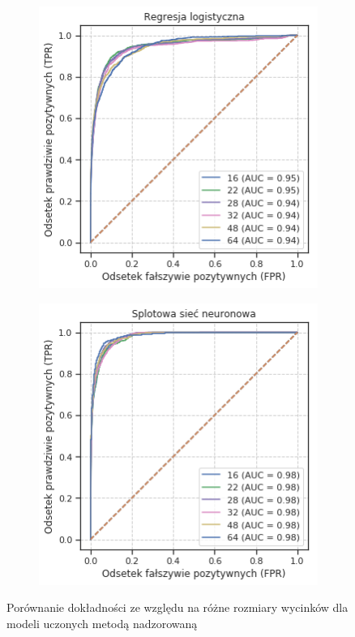\begin{figure}[h!]
  \centering
  \begin{subfigure}[b]{0.45\linewidth}
    \includegraphics[width=\linewidth]{images/logreg_patch_roc_v2}
  \end{subfigure}
  \begin{subfigure}[b]{0.45\linewidth}
    \includegraphics[width=\linewidth]{images/cnn_patch_roc_v2}
  \end{subfigure}
  \caption{Porównanie dokładności ze względu na różne rozmiary wycinków dla modeli uczonych metodą nadzorowaną}
  \label{fig:supervised_patches}
\end{figure}

